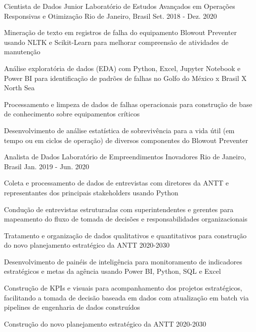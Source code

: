 \begin{cventries}
  \cventry
    {Cientista de Dados Junior} %
    {Laboratório de Estudos Avançados em Operações Responsivas e Otimização} %
    {Rio de Janeiro, Brasil} %
    {Set. 2018 - Dez. 2020} %
    {
      \begin{cvitems} %
        \item {Mineração de texto em registros de falha do equipamento Blowout Preventer usando NLTK e Scikit-Learn para melhorar compreensão de atividades de manutenção}
        \item {Análise exploratória de dados (EDA) com Python, Excel, Jupyter Notebook e Power BI para identificação de padrões de falhas no Golfo do México x Brasil X North Sea}
        \item {Processamento e limpeza de dados de falhas operacionais para construção de base de conhecimento sobre equipamentos críticos}
        \item {Desenvolvimento de análise estatística de sobrevivência para a vida útil (em tempo ou em ciclos de operação) de diversos componentes do Blowout Preventer}
      \end{cvitems}
    }

  \cventry
    {Analista de Dados} %
    {Laboratório de Empreendimentos Inovadores} %
    {Rio de Janeiro, Brasil} %
    {Jan. 2019 - Jun. 2020} %
    {
      \begin{cvitems} %
        \item {Coleta e processamento de dados de entrevistas com diretores da ANTT e representantes dos principais stakeholders usando Python}
        \item {Condução de entrevistas estruturadas com superintendentes e gerentes para mapeamento do fluxo de tomada de decisões e responsabilidades organizacionais}
        \item {Tratamento e organização de dados qualitativos e quantitativos para construção do novo planejamento estratégico da ANTT 2020-2030}
        \item {Desenvolvimento de painéis de inteligência para monitoramento de indicadores estratégicos e metas da agência usando Power BI, Python, SQL e Excel}
        \item {Construção de KPIs e visuais para acompanhamento dos projetos estratégicos, facilitando a tomada de decisão baseada em dados com atualização em batch via pipelines de engenharia de dados construídos}
        \item {Construção do novo planejamento estratégico da ANTT 2020-2030}
      \end{cvitems}
    }


\end{cventries}
